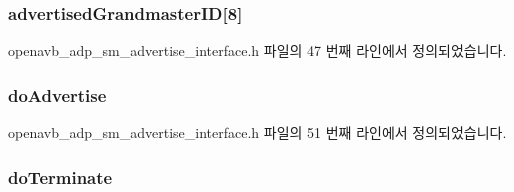 \subsubsection[{\texorpdfstring{advertised\+Grandmaster\+ID}{advertisedGrandmasterID}}]{ advertised\+Grandmaster\+ID\mbox{[}8\mbox{]}}\hypertarget{structopenavb__adp__sm__advertise__interface__vars__t_a408b05bc02e7222228de5dcce0351eb0}{}\label{structopenavb__adp__sm__advertise__interface__vars__t_a408b05bc02e7222228de5dcce0351eb0}


openavb\+\_\+adp\+\_\+sm\+\_\+advertise\+\_\+interface.\+h 파일의 47 번째 라인에서 정의되었습니다.

\subsubsection[{\texorpdfstring{do\+Advertise}{doAdvertise}}]{ do\+Advertise}\hypertarget{structopenavb__adp__sm__advertise__interface__vars__t_acd476f63fef77a199ec9cb8ff44f8a57}{}\label{structopenavb__adp__sm__advertise__interface__vars__t_acd476f63fef77a199ec9cb8ff44f8a57}


openavb\+\_\+adp\+\_\+sm\+\_\+advertise\+\_\+interface.\+h 파일의 51 번째 라인에서 정의되었습니다.

\subsubsection[{\texorpdfstring{do\+Terminate}{doTerminate}}]{ do\+Terminate}\hypertarget{structopenavb__adp__sm__advertise__interface__vars__t_a5fc548cdb095393450f28eab966a626f}{}\label{structopenavb__adp__sm__advertise__interface__vars__t_a5fc548cdb095393450f28eab966a626f}


